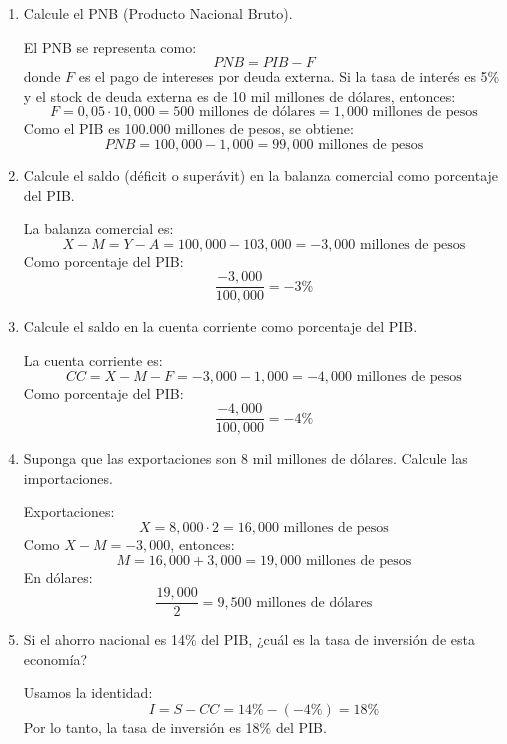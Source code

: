 \documentclass[a4paper]{article}
\begin{document}
\begin{enumerate}

    \item[a)] Calcule el PNB (Producto Nacional Bruto).
    \begin{solution}
    El PNB se representa como:
    \[
    PNB = PIB - F
    \]
    donde \(F\) es el pago de intereses por deuda externa.  
    Si la tasa de interés es 5\% y el stock de deuda externa es de 10 mil millones de dólares, entonces:
    \[
    F = 0{,}05 \cdot 10{,}000 = 500 \text{ millones de dólares} = 1{,}000 \text{ millones de pesos}
    \]
    Como el PIB es 100.000 millones de pesos, se obtiene:
    \[
    PNB = 100{,}000 - 1{,}000 = 99{,}000 \text{ millones de pesos}
    \]
    \end{solution}

    \item[b)] Calcule el saldo (déficit o superávit) en la balanza comercial como porcentaje del PIB.
    \begin{solution}
    La balanza comercial es:
    \[
    X - M = Y - A = 100{,}000 - 103{,}000 = -3{,}000 \text{ millones de pesos}
    \]
    Como porcentaje del PIB:
    \[
    \frac{-3{,}000}{100{,}000} = -3\%
    \]
    \end{solution}

    \item[c)] Calcule el saldo en la cuenta corriente como porcentaje del PIB.
    \begin{solution}
    La cuenta corriente es:
    \[
    CC = X - M - F = -3{,}000 - 1{,}000 = -4{,}000 \text{ millones de pesos}
    \]
    Como porcentaje del PIB:
    \[
    \frac{-4{,}000}{100{,}000} = -4\%
    \]
    \end{solution}

    \item[d)] Suponga que las exportaciones son 8 mil millones de dólares. Calcule las importaciones.
    \begin{solution}
    Exportaciones:
    \[
    X = 8{,}000 \cdot 2 = 16{,}000 \text{ millones de pesos}
    \]
    Como \( X - M = -3{,}000 \), entonces:
    \[
    M = 16{,}000 + 3{,}000 = 19{,}000 \text{ millones de pesos}
    \]
    En dólares:
    \[
    \frac{19{,}000}{2} = 9{,}500 \text{ millones de dólares}
    \]
    \end{solution}

    \item[e)] Si el ahorro nacional es 14\% del PIB, ¿cuál es la tasa de inversión de esta economía?
    \begin{solution}
    Usamos la identidad:
    \[
    I = S - CC = 14\% - (-4\%) = 18\%
    \]
    Por lo tanto, la tasa de inversión es 18\% del PIB.
    \end{solution}

\end{enumerate}
\end{document}
